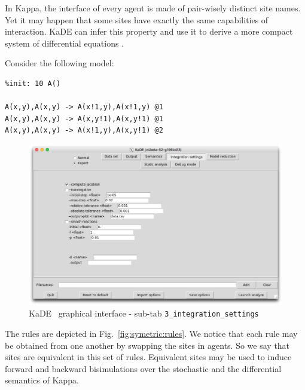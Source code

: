 \documentclass[11pt]{book}
\def\KaDE{\textsf{KaDE}}
\begin{document}
In Kappa, the interface of every agent is made of pair-wisely distinct site names. Yet it may happen that some sites have exactly the same capabilities of interaction. {\KaDE} can infer this property and use it to derive a more compact system of differential equations \cite{Feret-MFPSXXVII,CAMPORESI201073,Feret201545}.


Consider the following model:
\begin{lstlisting}[language=kappa]
%agent: A(x,y)
%init: 10 A()

A(x,y),A(x,y) -> A(x!1,y),A(x!1,y) @1
A(x,y),A(x,y) -> A(x,y!1),A(x,y!1) @1
A(x,y),A(x,y) -> A(x!1,y),A(x,y!1) @2
\end{lstlisting}

\begin{figure}[htbp]
\centering
\includegraphics[width=12cm,bb=0 0 1904 1208]{img/kade_3.png}
\caption{\KaDE~ graphical interface - sub-tab \texttt{3\_integration\_settings}}
\label{fig:kade:3}
\end{figure}


The rules are depicted in Fig.~\ref{fig:symetric:rules}. We notice that each rule may be obtained from one another by swapping the sites in agents.  So we say that sites are equivalent in this set of rules. Equivalent sites may be used to induce forward and backward bisimulations \cite{buchholz_bisimulation,Feret_IJSI2013,Feret-MFPSXXVII,CAMPORESI201073,Feret201545} over the stochastic and the differential semantics of Kappa.
\end{document}
